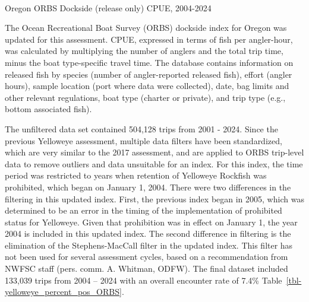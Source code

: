 \documentclass[
]{scrartcl}
\makeatletter
\let\oldparagraph\paragraph
\renewcommand{\paragraph}{
    \@ifstar
      \xxxParagraphStar
      \xxxParagraphNoStar
  }
\newcommand{\xxxParagraphStar}[1]{\oldparagraph*{#1}\mbox{}}
\newcommand{\xxxParagraphNoStar}[1]{\oldparagraph{#1}\mbox{}}
\makeatother
\begin{document}
\paragraph{Oregon ORBS Dockside (release only) CPUE,
2004-2024}\label{oregon-orbs-dockside-release-only-cpue-2004-2024}

The Ocean Recreational Boat Survey (ORBS) dockside index for Oregon was
updated for this assessment. CPUE, expressed in terms of fish per
angler-hour, was calculated by multiplying the number of anglers and the
total trip time, minus the boat type-specific travel time. The database
contains information on released fish by species (number of
angler-reported released fish), effort (angler hours), sample location
(port where data were collected), date, bag limits and other relevant
regulations, boat type (charter or private), and trip type (e.g., bottom
associated fish).

The unfiltered data set contained 504,128 trips from 2001 - 2024. Since
the previous Yelloweye assessment, multiple data filters have been
standardized, which are very similar to the 2017 assessment, and are
applied to ORBS trip-level data to remove outliers and data unsuitable
for an index. For this index, the time period was restricted to years
when retention of Yelloweye Rockfish was prohibited, which began on
January 1, 2004. There were two differences in the filtering in this
updated index. First, the previous index began in 2005, which was
determined to be an error in the timing of the implementation of
prohibited status for Yelloweye. Given that prohibition was in effect on
January 1, the year 2004 is included in this updated index. The second
difference in filtering is the elimination of the Stephens-MacCall
filter in the updated index. This filter has not been used for several
assessment cycles, based on a recommendation from NWFSC staff (pers.
comm. A. Whitman, ODFW). The final dataset included 133,039 trips from
2004 -- 2024 with an overall encounter rate of 7.4\%
Table~\ref{tbl-yelloweye_percent_pos_ORBS}.
\end{document}
